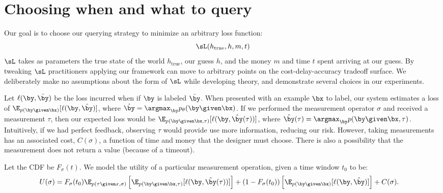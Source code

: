 \section{Choosing when and what to query}
\label{sec:async}


Our goal is to choose our querying strategy to minimize an arbitrary loss function:
\[\sL(h_{\text{true}}, h, m, t)\]
$\sL$ takes as parameters the true state of the world $h_{\text{true}}$, our guess $h$, and the money $m$ and time $t$ spent arriving at our guess.
 By tweaking $\sL$ practitioners applying our framework can move to arbitrary points on the cost-delay-accuracy tradeoff surface.
 We deliberately make no assumptions about the form of $\sL$ while developing theory, and demonstrate several choices in our experiments.


Let $\ell(\by, \byt)$ be the loss incurred when if $\by$ is labeled $\byt$.
When presented with an example $\bx$ to label, our system estimates a loss of $\E_{p(\by \given \bx)}[\ell(\by, \byt)]$, where $\byt = \argmax_{\by} \p(\by \given \bx)$.
If we performed the measurement operator $\sigma$ and received a measurement $\tau$,
then our expected loss would be $\E_{p(\by \given \bx, \tau)}[\ell(\by, \byt(\tau))]$, where $\byt(\tau) = \argmax_{\by} p(\by \given \bx, \tau)$.
Intuitively, if we had perfect feedback, observing $\tau$ would provide use more information, reducing our risk.
However, taking measurements has an associated cost, $C(\sigma)$, a function of time and money that the designer must choose.
There is also a possibility that the measurement does not return a value (because of a timeout).

Let the CDF be $F_\sigma(t)$.
We model the utility of a particular measurement operation, given a time window $t_0$ to be:
\begin{align*}
U(\sigma)
&= F_\sigma(t_0) 
  \E_{p(\tau \given x, \sigma)} \left[\E_{p(\by \given \bx, \tau)}[\ell(\by, \byt(\tau))] \right]
  + (1 - F_\sigma(t_0)) 
    \left[\E_{p(\by \given \bx)}[\ell(\by, \byt)] \right]
  + C(\sigma).
\end{align*}


